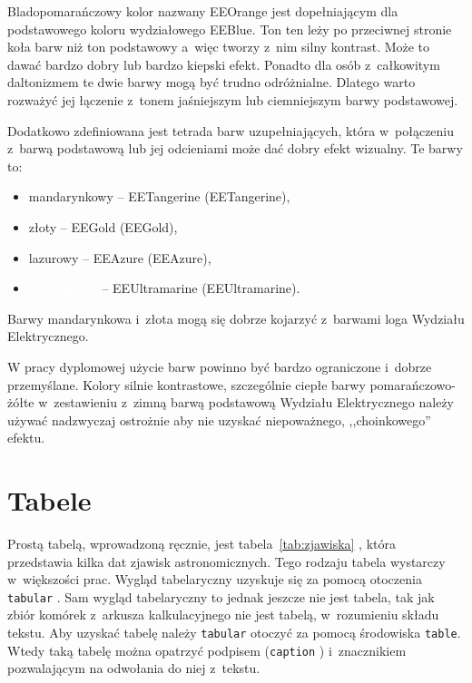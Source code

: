 Bladopomarańczowy kolor nazwany \textcolor{EEOrange}{EEOrange}
jest dopełniającym dla podstawowego koloru wydziałowego EEBlue. Ton ten leży po przeciwnej stronie koła barw niż ton
podstawowy a~więc tworzy z~nim silny kontrast. Może to dawać bardzo dobry lub bardzo kiepski efekt. Ponadto dla osób
z~całkowitym daltonizmem te dwie barwy mogą być trudno odróżnialne. Dlatego warto rozważyć jej łączenie z~tonem
jaśniejszym lub ciemniejszym barwy podstawowej.

Dodatkowo zdefiniowana jest tetrada barw uzupełniających, która w~połączeniu z~barwą podstawową lub jej odcieniami może
dać dobry efekt wizualny. Te barwy to:
\begin{itemize}
    \item \colorbox{EETangerine}{mandarynkowy} -- \textcolor{EETangerine}{EETangerine} (EETangerine),
    \item \colorbox{EEGold}{złoty} --  \textcolor{EEGold}{EEGold} (EEGold),
    \item \colorbox{EEAzure}{lazurowy} --  \textcolor{EEAzure}{EEAzure} (EEAzure),
    \item \colorbox{EEUltramarine}{\textcolor{white}{ultramaryna}} --
    \textcolor{EEUltramarine}{EEUltramarine} (EEUltramarine).
\end{itemize}
Barwy mandarynkowa i~złota mogą się dobrze kojarzyć z~barwami loga Wydziału Elektrycznego.

W pracy dyplomowej użycie barw powinno być bardzo ograniczone i~dobrze przemyślane. Kolory silnie kontrastowe,
szczególnie ciepłe barwy pomarańczowo-żółte w~zestawieniu z~zimną barwą podstawową Wydziału Elektrycznego należy używać
nadzwyczaj ostrożnie aby nie uzyskać niepoważnego, ,,choinkowego'' efektu.



\section{Tabele}
Prostą tabelą, wprowadzoną ręcznie, jest tabela~\ref{tab:zjawiska}
, która przedstawia kilka dat zjawisk astronomicznych. Tego rodzaju tabela wystarczy w~większości prac. Wygląd
tabelaryczny uzyskuje się za pomocą otoczenia \texttt{tabular}
. Sam wygląd tabelaryczny to jednak jeszcze nie jest tabela, tak jak zbiór komórek z~arkusza kalkulacyjnego nie jest
tabelą, w~rozumieniu składu tekstu. Aby uzyskać tabelę należy \texttt{tabular} otoczyć za pomocą środowiska
\texttt{table}. Wtedy taką tabelę można opatrzyć podpisem (\texttt{caption}
) i~znacznikiem pozwalającym na odwołania do niej z~tekstu.

